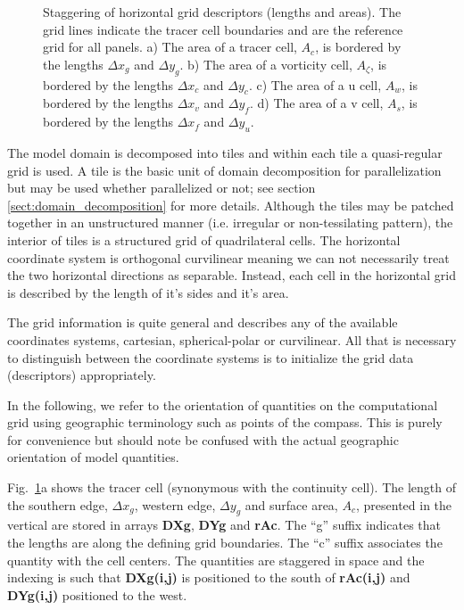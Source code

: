 \begin{figure}
\begin{center}
\begin{tabular}{cc}
\end{tabular}
\end{center}
\caption{
Staggering of horizontal grid descriptors (lengths and areas). The
grid lines indicate the tracer cell boundaries and are the reference
grid for all panels. a) The area of a tracer cell, $A_c$, is bordered
by the lengths $\Delta x_g$ and $\Delta y_g$. b) The area of a
vorticity cell, $A_\zeta$, is bordered by the lengths $\Delta x_c$ and
$\Delta y_c$. c) The area of a u cell, $A_w$, is bordered by the
lengths $\Delta x_v$ and $\Delta y_f$. d) The area of a v cell, $A_s$,
is bordered by the lengths $\Delta x_f$ and $\Delta y_u$.}
\label{fig:hgrid}
\end{figure}

The model domain is decomposed into tiles and within each tile a
quasi-regular grid is used. A tile is the basic unit of domain
decomposition for parallelization but may be used whether parallelized
or not; see section \ref{sect:domain_decomposition} for more details. 
Although the tiles may be patched together in an unstructured manner
(i.e. irregular or non-tessilating pattern), the interior of tiles is
a structured grid of quadrilateral cells. The horizontal coordinate
system is orthogonal curvilinear meaning we can not necessarily treat
the two horizontal directions as separable. Instead, each cell in the
horizontal grid is described by the length of it's sides and it's
area.

The grid information is quite general and describes any of the
available coordinates systems, cartesian, spherical-polar or
curvilinear. All that is necessary to distinguish between the
coordinate systems is to initialize the grid data (descriptors)
appropriately.

In the following, we refer to the orientation of quantities on the
computational grid using geographic terminology such as points of the
compass.
This is purely for convenience but should note be confused
with the actual geographic orientation of model quantities.

Fig.~\ref{fig:hgrid}a shows the tracer cell (synonymous with the
continuity cell). The length of the southern edge, $\Delta x_g$,
western edge, $\Delta y_g$ and surface area, $A_c$, presented in the
vertical are stored in arrays {\bf DXg}, {\bf DYg} and {\bf rAc}.
The ``g'' suffix indicates that the lengths are along the defining
grid boundaries. The ``c'' suffix associates the quantity with the
cell centers. The quantities are staggered in space and the indexing
is such that {\bf DXg(i,j)} is positioned to the south of {\bf
rAc(i,j)} and {\bf DYg(i,j)} positioned to the west.

